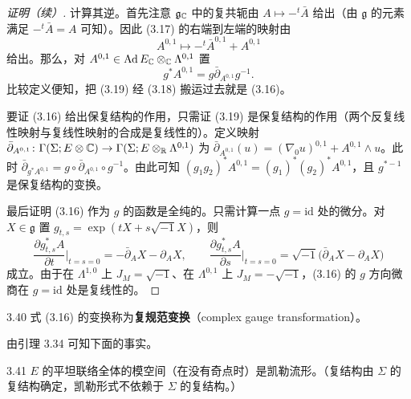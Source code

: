 \begin{proof}[证明（续）]

计算其逆。首先注意 $\mathfrak{g}_{\mathbb{C}}$ 中的复共轭由 $A\mapsto-{}^t\bar A$ 给出（由 $\mathfrak{g}$ 的元素满足 $-{}^t\bar A=A$ 可知）。因此 (3.17) 的右端到左端的映射由
\begin{equation}
  A^{0,1}\mapsto-{}^t\bar A^{0,1}+A^{0,1} \tag{3.18}
\end{equation}
给出。那么，对 $A^{0,1}\in\mathrm{Ad}\,E_{\mathbb{C}}\otimes_{\mathbb{C}}\Lambda^{0,1}$ 置
\begin{equation}
  g^*A^{0,1}=g\bar\partial_{A^{0,1}}g^{-1}. \tag{3.19}
\end{equation}
比较定义便知，把 (3.19) 经 (3.18) 搬运过去就是 (3.16)。

要证 (3.16) 给出保复结构的作用，只需证 (3.19) 是保复结构的作用（两个反复线性映射与复线性映射的合成是复线性的）。定义映射 $\bar\partial_{A^{0,1}}\colon\Gamma(\Sigma;E\otimes\mathbb{C})\to\Gamma(\Sigma;E\otimes_{\mathbb{R}}\Lambda^{0,1})$ 为 $\bar\partial_{A^{0,1}}(u)=(\nabla_0u)^{0,1}+A^{0,1}\wedge u$。此时 $\bar\partial_{g^*A^{0,1}}=g\circ\bar\partial_{A^{0,1}}\circ g^{-1}$。由此可知 $(g_1g_2)^*A^{0,1}=(g_1)^*(g_2)^*A^{0,1}$，且 $g^{*-1}$ 是保复结构的变换。

最后证明 (3.16) 作为 $g$ 的函数是全纯的。只需计算一点 $g=\mathrm{id}$ 处的微分。对 $X\in\mathfrak{g}$ 置 $g_{t,s}=\exp(tX+s\sqrt{-1}X)$，则
\[
  \frac{\partial g^*_{t,s}A}{\partial t}\Big|_{t=s=0}=-\bar\partial_AX-\partial_AX,\qquad
  \frac{\partial g^*_{t,s}A}{\partial s}\Big|_{t=s=0}=\sqrt{-1}\bigl(\bar\partial_AX-\partial_AX\bigr)
\]
成立。由于在 $\Lambda^{1,0}$ 上 $J_M=\sqrt{-1}$、在 $\Lambda^{0,1}$ 上 $J_M=-\sqrt{-1}$，(3.16) 的 $g$ 方向微商在 $g=\mathrm{id}$ 处是复线性的。
\end{proof}


\begin{definition}{3.40}
  式 (3.16) 的变换称为\textbf{复规范变换}（complex gauge transformation）。
\end{definition}

由引理 3.34 可知下面的事实。

\begin{theorem}{3.41}
  $E$ 的平坦联络全体的模空间（在没有奇点时）是凯勒流形。（复结构由 $\Sigma$ 的复结构确定，凯勒形式不依赖于 $\Sigma$ 的复结构。）
\end{theorem}

